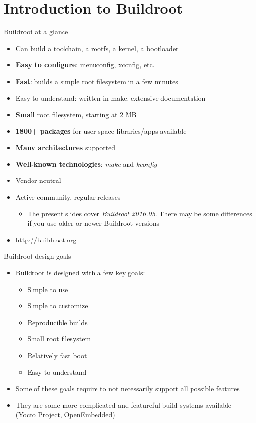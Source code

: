 \section{Introduction to Buildroot}

\begin{frame}{Buildroot at a glance}
  \begin{itemize}
  \item Can build a toolchain, a rootfs, a kernel, a bootloader
  \item {\bf Easy to configure}: menuconfig, xconfig, etc.
  \item {\bf Fast}: builds a simple root filesystem in a few minutes
  \item Easy to understand: written in make, extensive documentation
  \item {\bf Small} root filesystem, starting at 2 MB
  \item {\bf 1800+ packages} for user space libraries/apps available
  \item {\bf Many architectures} supported
  \item {\bf Well-known technologies}: {\em make} and {\em kconfig}
  \item Vendor neutral
  \item Active community, regular releases
    \begin{itemize}
    \item The present slides cover {\em Buildroot 2016.05}. There may
      be some differences if you use older or newer Buildroot versions.
    \end{itemize}
  \item \url{http://buildroot.org}
  \end{itemize}
\end{frame}

\begin{frame}{Buildroot design goals}
  \begin{itemize}
  \item Buildroot is designed with a few key goals:
    \begin{itemize}
    \item Simple to use
    \item Simple to customize
    \item Reproducible builds
    \item Small root filesystem
    \item Relatively fast boot
    \item Easy to understand
    \end{itemize}
  \item Some of these goals require to not necessarily support all
    possible features
  \item They are some more complicated and featureful build systems
    available (Yocto Project, OpenEmbedded)
  \end{itemize}
\end{frame}

